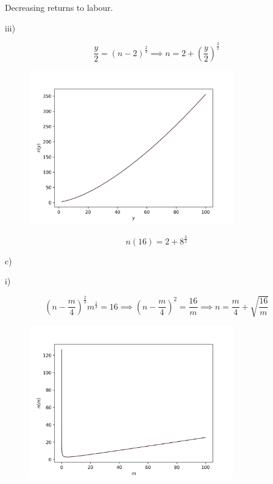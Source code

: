 \documentclass{article}
\begin{document}
Decreasing returns to labour.

\quad\quad iii)

$$
  \frac{y}{2} = (n-2)^{\frac{2}{3}} \implies n = 2 + \left( \frac{y}{2} \right)^{\frac{3}{2}}
$$

\begin{figure}[H]
  \centering
  \includegraphics[width=0.8\textwidth]{figures/4_Functions/LQ2biii.png}
\end{figure}

$$
  n(16) = 2+8^{\frac{3}{2}}
$$

c)

\quad\quad i)

$$
  \left( n-\frac{m}{4} \right)^{\frac{2}{3}}m^{\frac{1}{3}} = 16 \implies \left( n-\frac{m}{4} \right)^2 = \frac{16}{m} \implies n = \frac{m}{4} + \sqrt{\frac{16}{m}}
$$

\begin{figure}[H]
  \centering
  \includegraphics[width=0.8\textwidth]{figures/4_Functions/LQ2ci.png}
\end{figure}
\end{document}
